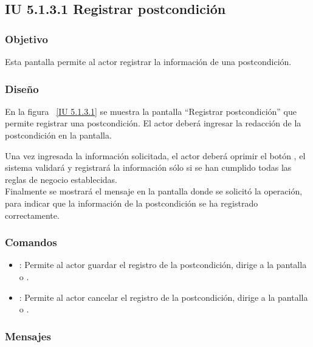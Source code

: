 \subsection{IU 5.1.3.1 Registrar postcondición}

\subsubsection{Objetivo}
	
	Esta pantalla permite al actor registrar la información de una postcondición.

\subsubsection{Diseño}

    En la figura ~\ref{IU 5.1.3.1} se muestra la pantalla ``Registrar postcondición'' que permite registrar una postcondición. El actor deberá ingresar la redacción de la postcondición en la pantalla.
    
    Una vez ingresada la información solicitada, el actor deberá oprimir el botón , el sistema validará y registrará la información sólo si se han cumplido todas las reglas de negocio establecidas.  \\
    
    Finalmente se mostrará el mensaje  en la pantalla donde se solicitó la operación, para indicar que la información de la postcondición
    se ha registrado correctamente.        




\subsubsection{Comandos}
\begin{itemize}
	\item {}: Permite al actor guardar el registro de la postcondición, dirige a la pantalla  o .
	\item {}: Permite al actor cancelar el registro de la postcondición, dirige a la pantalla  o .
\end{itemize}

\subsubsection{Mensajes}


